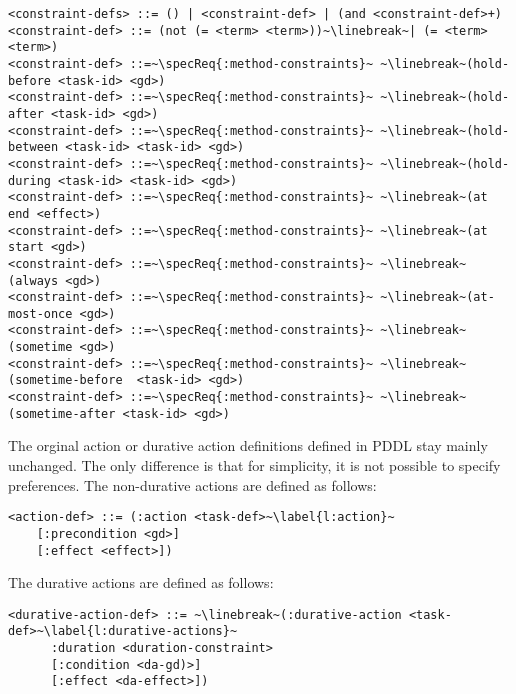 \documentclass{article}
\begin{document}
\begin{lstlisting}[firstnumber=last, escapechar=~]
<constraint-defs> ::= () | <constraint-def> | (and <constraint-def>+)
<constraint-def> ::= (not (= <term> <term>))~\linebreak~| (= <term> <term>)
<constraint-def> ::=~\specReq{:method-constraints}~ ~\linebreak~(hold-before <task-id> <gd>)
<constraint-def> ::=~\specReq{:method-constraints}~ ~\linebreak~(hold-after <task-id> <gd>)
<constraint-def> ::=~\specReq{:method-constraints}~ ~\linebreak~(hold-between <task-id> <task-id> <gd>)
<constraint-def> ::=~\specReq{:method-constraints}~ ~\linebreak~(hold-during <task-id> <task-id> <gd>)
<constraint-def> ::=~\specReq{:method-constraints}~ ~\linebreak~(at end <effect>)
<constraint-def> ::=~\specReq{:method-constraints}~ ~\linebreak~(at start <gd>)
<constraint-def> ::=~\specReq{:method-constraints}~ ~\linebreak~(always <gd>)
<constraint-def> ::=~\specReq{:method-constraints}~ ~\linebreak~(at-most-once <gd>)
<constraint-def> ::=~\specReq{:method-constraints}~ ~\linebreak~(sometime <gd>)
<constraint-def> ::=~\specReq{:method-constraints}~ ~\linebreak~(sometime-before  <task-id> <gd>)
<constraint-def> ::=~\specReq{:method-constraints}~ ~\linebreak~(sometime-after <task-id> <gd>)
\end{lstlisting}

%
%
The orginal action or durative action definitions defined in PDDL stay mainly unchanged. The only difference is that for simplicity, it is not possible to specify preferences. The non-durative actions are defined as follows:

\begin{lstlisting}[firstnumber=last, escapechar=~]
<action-def> ::= (:action <task-def>~\label{l:action}~
    [:precondition <gd>]
    [:effect <effect>])
\end{lstlisting}

%
%
\noindent The durative actions are defined as follows:

\begin{lstlisting}[firstnumber=last, escapechar=~]
<durative-action-def> ::= ~\linebreak~(:durative-action <task-def>~\label{l:durative-actions}~
      :duration <duration-constraint> 
      [:condition <da-gd)>]
      [:effect <da-effect>])
\end{lstlisting}
\end{document}
